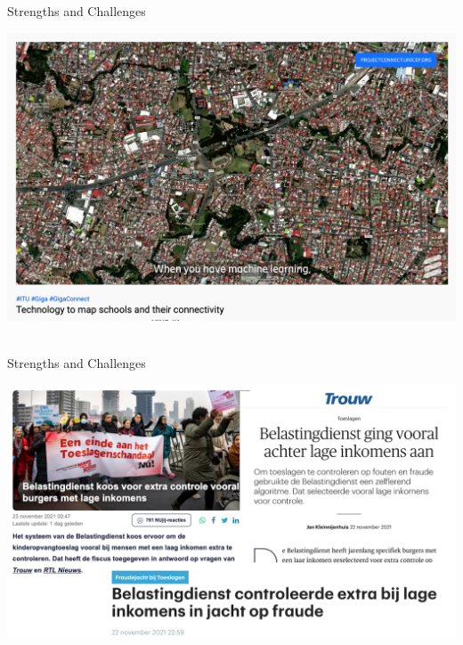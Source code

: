 \documentclass[handout]{beamer}
\begin{document}
\begin{frame}{Strengths and Challenges}
	
	
\begin{center}
	\includegraphics[width=\linewidth,height=\textheight,keepaspectratio]{../pictures/ericsson.png} \\\
\end{center}

\end{frame}
	


\begin{frame}{Strengths and Challenges}
	\begin{center}
		\includegraphics[width=\linewidth,height=\textheight,keepaspectratio]{../pictures/toeslagenaffaire_headlines.png} \\\
	\end{center}
	
	
\end{frame}
\end{document}

